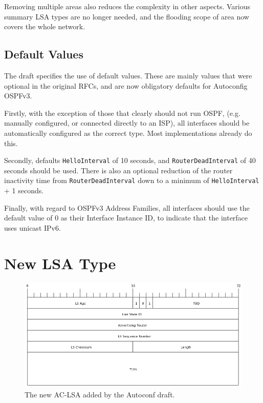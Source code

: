 \documentclass[12pt,a4paper,twoside]{report}
\begin{document}
Removing multiple areas also reduces the complexity in other aspects. Various
summary LSA types are no longer needed, and the flooding scope of area now
covers the whole network.

\subsection{Default Values}
The draft specifies the use of default values. These are mainly values that were
optional in the original RFCs, and are now obligatory defaults for Autoconfig
OSPFv3\@. 

Firstly, with the exception of those that clearly should not run OSPF, (e.g.\@
manually configured, or connected directly to an ISP), all interfaces
should be automatically configured as the correct type. Most implementations
already do this. 

Secondly, defaults \texttt{HelloInterval} of 10 seconds, and
\texttt{RouterDeadInterval} of 40 seconds should be used. There is also an
optional reduction of the router inactivity time from
\texttt{RouterDeadInterval} down to a minimum of \texttt{HelloInterval} + 1
seconds. 

Finally, with regard to OSPFv3 Address Families, all interfaces should use the
default value of 0 as their Interface Instance ID\@, to indicate that the
interface uses unicast IPv6.  

\section{New LSA Type}
\begin{figure}
\begin{center}
	\includegraphics[width=\linewidth]{../Diagrams/Packets/ac_lsa.png}
	\caption{The new AC-LSA added by the Autoconf draft.}\label{fig:AC-LSA}
\end{center}
\end{figure}
\end{document}

